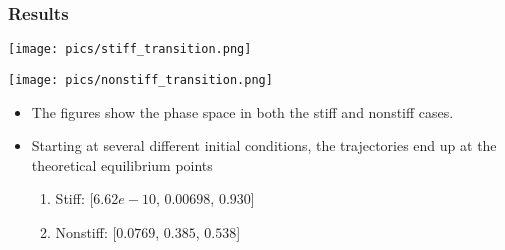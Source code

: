 \begin{frame}[fragile]
	\frametitle{\insertsubsectionhead \hspace{1pt} Results}
	\begin{minipage}{0.5\linewidth}
		\texttt{[image: pics/stiff\_transition.png]}
	\end{minipage}%
	\begin{minipage}{0.5\linewidth}
		\texttt{[image: pics/nonstiff\_transition.png]}
	\end{minipage}
	\begin{itemize}
		\item The figures show the phase space in both the stiff and nonstiff cases.
		\item Starting at several different initial conditions, the trajectories end up at the theoretical equilibrium points
		\begin{enumerate}
			\item Stiff: [$6.62e-10$, $0.00698$, $0.930$]
			\item Nonstiff: [$0.0769$, $0.385$, $0.538$]
		\end{enumerate}
	\end{itemize}
\end{frame}


